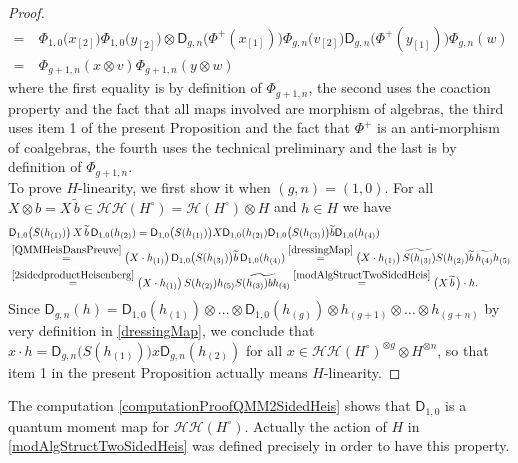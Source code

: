 \documentclass[11pt]{amsart}
\begin{document}
\begin{proof}
\begin{align*}
=\:&\Phi_{1,0}\bigl(x_{[2]}\bigr)\Phi_{1,0}\bigl(y_{[2]}\bigr) \otimes \mathsf{D}_{g,n}\bigl( \Phi^+(x_{[1]}) \bigr) \Phi_{g,n}\bigl(v_{[2]}\bigr) \mathsf{D}_{g,n}\bigl( \Phi^+(y_{[1]})\bigr) \Phi_{g,n}(w)\\
=\:& \Phi_{g+1,n}(x \otimes v) \Phi_{g+1,n}(y \otimes w)
\end{align*}
where the first equality is by definition of $\Phi_{g+1,n}$, the second uses the coaction property and the fact that all maps involved are morphism of algebras, the third uses item 1 of the present Proposition and the fact that $\Phi^+$ is an anti-morphism of coalgebras, the fourth uses the technical preliminary and the last is by definition of $\Phi_{g+1,n}$.
\\To prove $H$-linearity, we first show it when $(g,n)=(1,0)$. For all $X \otimes b = X \, \widetilde{b} \in \mathcal{HH}(H^\circ) = \mathcal{H}(H^\circ) \otimes H$ and $h \in H$ we have
\begin{align}
\begin{split}\label{computationProofQMM2SidedHeis}
&\mathsf{D}_{1,0}\bigl( S(h_{(1)}) \bigr) \, X \, \widetilde{b} \, \mathsf{D}_{1,0}(h_{(2)}) = \mathsf{D}_{1,0}\bigl( S(h_{(1)}) \bigr) X \mathsf{D}_{1,0}(h_{(2)}) \mathsf{D}_{1,0}\bigl( S(h_{(3)}) \bigr)  \widetilde{b} \mathsf{D}_{1,0}(h_{(4)})\\
&\overset{\eqref{QMMHeisDansPreuve}}{=} \bigl( X \cdot h_{(1)} \bigr) \,  \mathsf{D}_{1,0}\bigl( S(h_{(3)}) \bigr)  \widetilde{b} \,\mathsf{D}_{1,0}(h_{(4)}) \overset{\eqref{dressingMap}}{=} \bigl( X \cdot h_{(1)} \bigr) \, \widetilde{S(h_{(3)})} S(h_{(2)}) \widetilde{b} \,\widetilde{h_{(4)}} h_{(5)}\\
&\overset{\eqref{2sidedproductHeisenberg}}{=} \bigl( X \cdot h_{(1)} \bigr) \, S(h_{(2)})h_{(5)} \widetilde{S(h_{(3)})bh_{(4)}} \overset{\eqref{modAlgStructTwoSidedHeis}}{=} \bigl( X \, \widetilde{b} \, \bigr) \cdot h.
\end{split}
\end{align}
Since $\mathsf{D}_{g,n}(h) = \mathsf{D}_{1,0}(h_{(1)}) \otimes \ldots \otimes \mathsf{D}_{1,0}(h_{(g)}) \otimes h_{(g+1)} \otimes \ldots \otimes h_{(g+n)}$ by very definition in \eqref{dressingMap}, we conclude that $x \cdot h = \mathsf{D}_{g,n}\bigl( S(h_{(1)}) \bigr) x \mathsf{D}_{g,n}(h_{(2)})$ for all $x \in \mathcal{HH}(H^\circ)^{\otimes g} \otimes H^{\otimes n}$, so that item 1 in the present Proposition actually means $H$-linearity.
\end{proof}
\noindent The computation \eqref{computationProofQMM2SidedHeis} shows that $\mathsf{D}_{1,0}$ is a quantum moment map for $\mathcal{HH}(H^\circ)$. Actually the action of $H$ in \eqref{modAlgStructTwoSidedHeis} was defined precisely in order to have this property.
\end{document}
